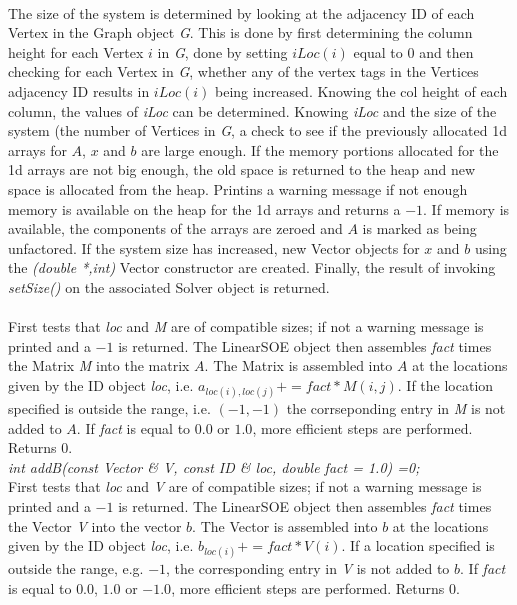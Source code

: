  \\ 
The size of the system is determined by looking at the adjacency ID of
each Vertex in the Graph object {\em G}. This is done by first
determining the column height for each Vertex $i$ in {\em G}, done by
setting $iLoc(i)$ equal to $0$ and then checking for each Vertex
in {\em G}, whether any of the vertex tags in the Vertices adjacency
ID results in $iLoc(i)$ being increased. Knowing the col height of
each column, the values of {\em iLoc} can be determined. Knowing {\em
iLoc} and the size of the system (the number of Vertices in {\em G}, 
a check to see if the previously allocated 1d arrays for $A$, $x$ and
$b$ are large enough. If the memory portions allocated for the 1d
arrays are not big enough, the old space is returned to the heap and
new space is allocated from the heap. Printins a warning message if
not enough memory is available on the heap for the 1d arrays and
returns a $-1$. If memory is available, the components of the arrays
are zeroed and $A$ is marked as being unfactored. If the system size
has increased, new Vector objects for $x$ and $b$ using the {\em
(double *,int)} Vector constructor are created. Finally, the result of 
invoking {\em setSize()} on the associated Solver object is
returned. \\ 


 \\
First tests that {\em loc} and {\em M} are of compatible sizes; if not
a warning message is printed and a $-1$ is returned. The LinearSOE
object then assembles {\em fact} times the Matrix {\em 
M} into the matrix $A$. The Matrix is assembled into $A$ at the
locations given by the ID object {\em loc}, i.e. $a_{loc(i),loc(j)} +=
fact * M(i,j)$. If the location specified is outside the range,
i.e. $(-1,-1)$ the corrseponding entry in {\em M} is not added to
$A$. If {\em fact} is equal to $0.0$ or $1.0$, more efficient steps
are performed. Returns $0$.  \\


{\em int addB(const Vector \& V, const ID \& loc,
double fact = 1.0) =0;} \\
First tests that {\em loc} and {\em V} are of compatible sizes; if not
a warning message is printed and a $-1$ is returned. The LinearSOE
object then assembles {\em fact} times the Vector {\em V} into
the vector $b$. The Vector is assembled into $b$ at the locations
given by the ID object {\em loc}, i.e. $b_{loc(i)} += fact * V(i)$. If a
location specified is outside the range, e.g. $-1$, the corresponding
entry in {\em V} is not added to $b$. If {\em fact} is equal to $0.0$,
$1.0$ or $-1.0$, more efficient steps are performed. Returns $0$. \\


